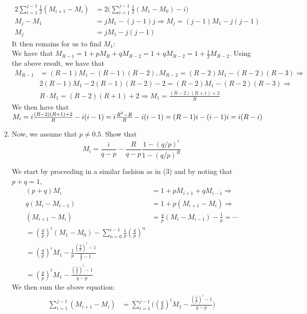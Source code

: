 \documentclass[12pt,twoside, letter]{exam}
\theoremstyle{definition}
\begin{document}
\begin{enumerate}
\begin{solution}
\begin{align*}
        2\sum^{j-1}_{i=1}\frac{1}{2}(M_{i+1} - M_{i}) &= 2\big(\sum^{j-1}_{i=1} \frac{1}{2} (M_{1} - M_{0}) - i\big)\\
        M_{j} - M_{1} &= jM_{1} - (j-1)j \Rightarrow M_{j} = (j-1)M_{1} - j(j-1) \\
        M_{j} &= jM_{1} - j(j-1)
      \end{align*}
      It then remains for us to find $M_1$: \\
      We have that $M_{R-1} = 1 + pM_{R} + qM_{R-2} = 1 + qM_{R-2} = 1 + \frac{1}{2} M_{R-2}$. Using the above result, we have that
      \begin{align*}
        M_{R-1} &= (R-1)M_{1} - (R-1)(R-2), M_{R-2} = (R-2)M_{1} - (R-2)(R-3) \Rightarrow \\
        &2(R-1)M_{1} - 2(R-1)(R-2) - 2 = (R-2)M_{1} - (R-2)(R-3) \Rightarrow \\
        &R\cdot M_{1} = (R-2)(R+1) + 2 \Rightarrow M_{1} = \frac{(R-2)(R+1) + 2}{R}
      \end{align*}
      We then have that $M_{i} = i\frac{(R-2)(R+1)+2}{R} - i(i-1) \\
       = i\frac{R^2-R}{R} - i(i-1) = (R-1)i - (i-1)i = i(R-i)$
    \end{solution}
  \item Now, we assume that $p \neq 0.5$. Show that
    \begin{equation*}
      M_i = \frac{i}{q-p} - \frac{R}{q-p}\frac{1-(q/p)^i}{1-(q/p)^R}
    \end{equation*}
      \begin{solution}
      We start by proceeding in a similar fashion as in (3) and by noting that $p+q=1$,
      \begin{align*}
        (p+q)M_i &= 1 + pM_{i+1} + qM_{i-1} \Rightarrow \\
        q(M_{i} - M_{i-1}) &= 1 + p(M_{i+1} - M_{i}) \Rightarrow \\
        (M_{i+1} - M_{i}) &= \frac{q}{p} (M_{i} - M_{i-1}) - \frac{1}{p}  = \cdots \\
        = (\frac{q}{p})^{i} (M_{1} - M_{0}) - \sum^{i-1}_{n = 0} \frac{1}{p}(\frac{q}{p})^{n} \\
        = (\frac{q}{p})^i M_1 - \frac{1}{p}\frac{(\frac{q}{p})^i - 1}{\frac{q}{p} - 1} \\
        = (\frac{q}{p})^i M_1 - \frac{(\frac{q}{p})^i - 1}{q-p}
      \end{align*}
      We then sum the above equation:
      \begin{align*}
        \sum^{j-1}_{i=1}(M_{i+1} - M_{i}) &= \sum^{j-1}_{i=1}\bigg( (\frac{q}{p})^i M_1 - \frac{(\frac{q}{p})^i - 1}{q-p} \bigg)\\

\end{align*}
\end{solution}
\end{enumerate}
\end{document}
